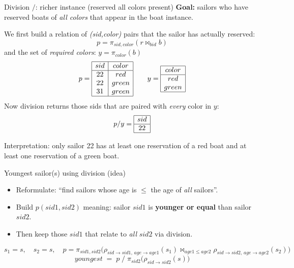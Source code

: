 \documentclass[10pt,aspectratio=169]{beamer}
\newcommand{\proj}{\pi}
\newcommand{\rename}{\rho}
\begin{document}
\begin{frame}{Division \(/ \): richer instance (reserved all colors present)}
\small
\textbf{Goal:} sailors who have reserved boats of \emph{all colors} that appear in the boat instance.

\smallskip
We first build a relation of \emph{(sid,color)} pairs that the sailor has actually reserved:
\[
p=\proj_{sid,color}(r \Join_{bid} b)
\]
and the set of \emph{required colors}:
$
y=\proj_{color}(b)
$
\[
p=\begin{array}{|c|c|}\hline
sid&color\\\hline
22&red\\
22&green\\
31&green\\\hline
\end{array}
\qquad
y=\begin{array}{|c|}\hline
color\\\hline
red\\
green\\\hline
\end{array}
\]
Now division returns those sids that are paired with \emph{every} color in \(y\):
\[
p/y=
\begin{array}{|c|}\hline
sid\\\hline
22\\\hline
\end{array}
\]

\smallskip
\small Interpretation: only sailor 22 has at least one reservation of a red boat and at least one reservation of a green boat.
\end{frame}


\begin{frame}{Youngest sailor(s) using division (idea)}
\begin{itemize}
  \item Reformulate: “find sailors whose age is \(\le\) the age of \emph{all} sailors”.
  \item Build \(p(sid1,sid2)\) meaning: sailor \(sid1\) is \textbf{younger or equal} than sailor \(sid2\).
  \item Then keep those \(sid1\) that relate to \emph{all} \(sid2\) via division.
\end{itemize}

\small
\[
s_1=s,\quad s_2=s,\quad
p=\proj_{sid1,sid2}\Big(\rename_{sid\rightarrow sid1,\,age\rightarrow age1}(s_1)\Join_{age1\le age2}\rename_{sid\rightarrow sid2,\,age\rightarrow age2}(s_2)\Big)
\]
\[
youngest \;=\; p\; /\; \proj_{sid2}\big(\rename_{sid\rightarrow sid2}(s)\big)
\]
\end{frame}
\end{document}

